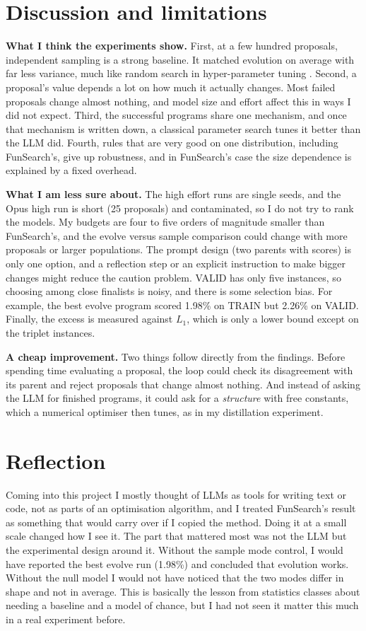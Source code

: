 \documentclass[10pt]{article}
\begin{document}
\section{Discussion and limitations}
\textbf{What I think the experiments show.} First, at a few hundred proposals, independent sampling
is a strong baseline. It matched evolution on average with far less variance, much like random search
in hyper-parameter tuning \cite{bergstra2012random}. Second, a proposal's value depends a lot on how
much it actually changes. Most failed proposals change almost nothing, and model size and effort
affect this in ways I did not expect. Third, the successful programs share one mechanism, and once
that mechanism is written down, a classical parameter search tunes it better than the LLM did.
Fourth, rules that are very good on one distribution, including FunSearch's, give up robustness, and
in FunSearch's case the size dependence is explained by a fixed overhead.

\textbf{What I am less sure about.} The high effort runs are single seeds, and the Opus high run is
short (25 proposals) and contaminated, so I do not try to rank the models. My budgets are four to
five orders of magnitude smaller than FunSearch's, and the evolve versus sample comparison could
change with more proposals or larger populations. The prompt design (two parents with scores) is
only one option, and a reflection step \cite{ye2024reevo} or an explicit instruction to make bigger
changes might reduce the caution problem. VALID has only five instances, so choosing among close
finalists is noisy, and there is some selection bias. For example, the best evolve program scored
1.98\% on TRAIN but 2.26\% on VALID. Finally, the excess is measured against $L_1$, which is only a
lower bound except on the triplet instances.

\textbf{A cheap improvement.} Two things follow directly from the findings. Before spending time
evaluating a proposal, the loop could check its disagreement with its parent and reject proposals
that change almost nothing. And instead of asking the LLM for finished programs, it could ask for a
\emph{structure} with free constants, which a numerical optimiser then tunes, as in my distillation
experiment.

\section{Reflection}
Coming into this project I mostly thought of LLMs as tools for writing text or code, not as parts of
an optimisation algorithm, and I treated FunSearch's result as something that would carry over if I
copied the method. Doing it at a small scale changed how I see it. The part that mattered most was
not the LLM but the experimental design around it. Without the sample mode control, I would have
reported the best evolve run (1.98\%) and concluded that evolution works. Without the null model I
would not have noticed that the two modes differ in shape and not in average. This is basically the
lesson from statistics classes about needing a baseline and a model of chance, but I had not seen it
matter this much in a real experiment before.
\end{document}
